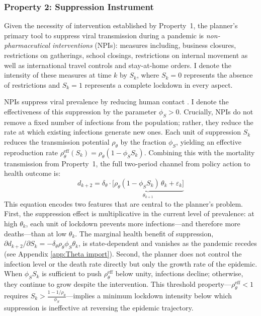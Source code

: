 \documentclass[12pt, a4paper]{article}
\newcommand{\Sk}{S_k}
\begin{document}
\subsubsection*{Property 2: Suppression Instrument}
Given the necessity of intervention established by Property~1, the planner's primary tool to suppress viral transmission during a pandemic is \textit{non-pharmaceutical interventions} (NPIs): measures including, business closures, restrictions on gatherings, school closings, restrictions on internal movement as well as international travel controls and stay-at-home orders. I denote the intensity of these measures at time $k$ by $\Sk$, where $\Sk = 0$ represents the absence of restrictions and $\Sk = 1$ represents a complete lockdown in every aspect. 


NPIs suppress viral prevalence by reducing human contact \citep{Flaxman2020}. I denote the effectiveness of this suppression by the parameter $\phi_S > 0$. Crucially, NPIs do not remove a fixed number of infections from the population; rather, they reduce the rate at which existing infections generate new ones. Each unit of suppression $S_k$ reduces the transmission potential $\rho_\theta$ by the fraction $\phi_S$, yielding an effective reproduction rate $\rho_\theta^{\text{eff}}(S_k) = \rho_\theta(1 - \phi_S S_k)$. Combining this with the mortality transmission from Property~1, the full two-period channel from policy action to health outcome is:
%
\begin{equation}
    d_{k+2} = \delta_\theta \cdot \underbrace{\bigl[\rho_\theta (1 - \phi_S S_k) \, \theta_k + \varepsilon_k\bigr]}_{\theta_{k+1}} 
    \label{eq:excess dynamics}
\end{equation}
%
This equation encodes two features that are central to the planner's problem. First, the suppression effect is multiplicative in the current level of prevalence: at high $\theta_k$, each unit of lockdown prevents more infections---and therefore more deaths---than at low $\theta_k$. The marginal health benefit of suppression, $\partial d_{k+2} / \partial S_k = -\delta_\theta \rho_\theta \phi_S \theta_k$, is state-dependent and vanishes as the pandemic recedes (see Appendix \ref{app:Theta import}). Second, the planner does not control the infection level or the death rate directly but only the growth rate of the epidemic. When $\phi_S S_k$ is sufficient to push $\rho_\theta^{\text{eff}}$ below unity, infections decline; otherwise, they continue to grow despite the intervention. This threshold property---$\rho_\theta^{\text{eff}} < 1$ requires $S_k > \frac{1 - 1/\rho_\theta}{\phi_S}$---implies a minimum lockdown intensity below which suppression is ineffective at reversing the epidemic trajectory.
\end{document}
